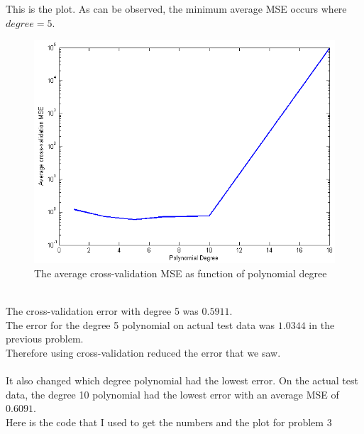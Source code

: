 \documentclass[twoside,11pt]{article}
\theoremstyle{definition}
\begin{document}
This is the plot. As can be observed, the minimum average MSE occurs where $degree=5$. \\
\begin{figure}[h]
\centering
\includegraphics[width=\columnwidth]{prob2Plot.png}
\caption{The average cross-validation MSE as function of polynomial degree}
\end{figure}
\\
The cross-validation error with degree 5 was $0.5911$. \\
The error for the degree 5 polynomial on actual test data was $1.0344$ in the previous problem. \\
Therefore using cross-validation reduced the error that we saw.\\
\\
It also changed which degree polynomial had the lowest error. On the actual test data, the degree 10 polynomial had the lowest error with an average MSE of $0.6091$.
\\
\newpage
Here is the code that I used to get the numbers and the plot for problem 3

\end{document}
